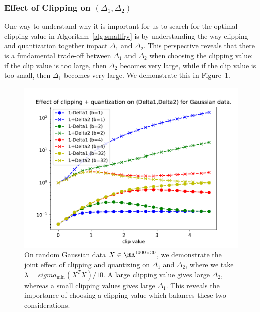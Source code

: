 \subsubsection{Effect of Clipping on $(\Delta_1,\Delta_2)$}
\label{sec:theory_clipping}
One way to understand why it is important for us to search for the optimal clipping value in Algorithm~\ref{alg:smallfry} is by understanding the way clipping and quantization together impact $\Delta_1$ and $\Delta_2$.
This perspective reveals that there is a fundamental trade-off between $\Delta_1$ and $\Delta_2$ when choosing the clipping value:
if the clip value is too large, then $\Delta_2$ becomes very large, while if the clip value is too small, then $\Delta_1$ becomes very large.
We demonstrate this in Figure~\ref{fig:deltas_vs_clip_quant}.
\begin{figure}
	\begin{center}
		\centerline{\includegraphics[width=0.8\columnwidth]{figures/deltas_vs_clip_and_quant.pdf}}
		\caption{On random Gaussian data $X \in \RR^{1000\times 30}$, we demonstrate the joint effect of clipping and quantizing on $\Delta_1$ and $\Delta_2$, where we take $\lambda = sigma_{\min}(X^T X)/10$.
		A large clipping value gives large $\Delta_2$, whereas a small clipping values gives large $\Delta_1$.
		This reveals the importance of choosing a clipping value which balances these two considerations.
		}
		\label{fig:deltas_vs_clip_quant}
	\end{center}
\end{figure}


